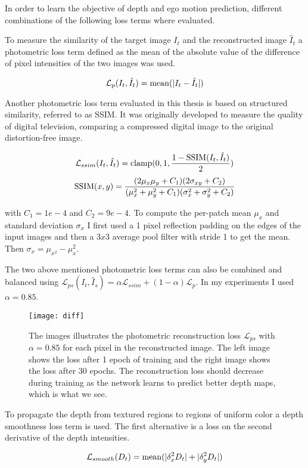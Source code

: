 In order to learn the objective of depth and ego motion prediction, different combinations of the following loss terms where evaluated.

To measure the similarity of the target image $I_t$ and the reconstructed image $\hat{I}_t$ a photometric loss term defined as the mean of the absolute value of the difference of pixel intensities of the two images was used.

\[
\mathcal{L}_p(I_t, \hat{I}_t)=\operatorname{mean}(|I_t - \hat{I}_t|)
\]

Another photometric loss term evaluated in this thesis is based on structured similarity, referred to as SSIM\cite{ssim}. It was originally developed to measure the quality of digital television, comparing a compressed digital image to the original distortion-free image.

\[
\mathcal{L}_{ssim}(I_t, \hat{I}_t)=\operatorname{clamp}(0,1,\dfrac{1-\operatorname{SSIM}(I_t, \hat{I}_t)}{2})
\]
\[
\operatorname{SSIM}(x,y)=\frac{(2\mu_x\mu_y+C_1)(2\sigma_{xy}+C_2)}{(\mu_x^2+\mu_y^2+C_1)(\sigma_x^2+\sigma_y^2+C_2)}
\]

with $C_1=1e-4$ and $C_2=9e-4$. To compute the per-patch mean $\mu_x$ and standard deviation $\sigma_x$ I first used a 1 pixel reflection padding on the edges of the input images and then a $3x3$ average pool filter with stride 1 to get the mean. Then $ \sigma_x=\mu_{x^2}-\mu_x^2 $.

The two above mentioned photometric loss terms can also be combined and balanced using $ \mathcal{L}_{ps}(I_t, \hat{I}_s) = \alpha \mathcal{L}_{ssim} + (1-\alpha) \mathcal{L}_p $. In my experiments I used $\alpha=0.85$.

\begin{figure}[H]
	\centering
	\texttt{[image: diff]}
	\caption{The images illustrates the photometric reconstruction loss $ \mathcal{L}_{ps} $ with $\alpha=0.85$ for each pixel in the reconstructed image. The left image shows the loss after 1 epoch of training and the right image shows the loss after 30 epochs. The reconstruction loss should decrease during training as the network learns to predict better depth maps, which is what we see.}
	\label{fig:diff}
\end{figure}

To propagate the depth from textured regions to regions of uniform color a depth smoothness loss term is used. The first alternative is a loss on the second derivative of the depth intensities.

\[
\mathcal{L}_{smooth}(D_t)=\operatorname{mean}(|\delta_x^2 D_t|+|\delta_y^2 D_t|)
\]

